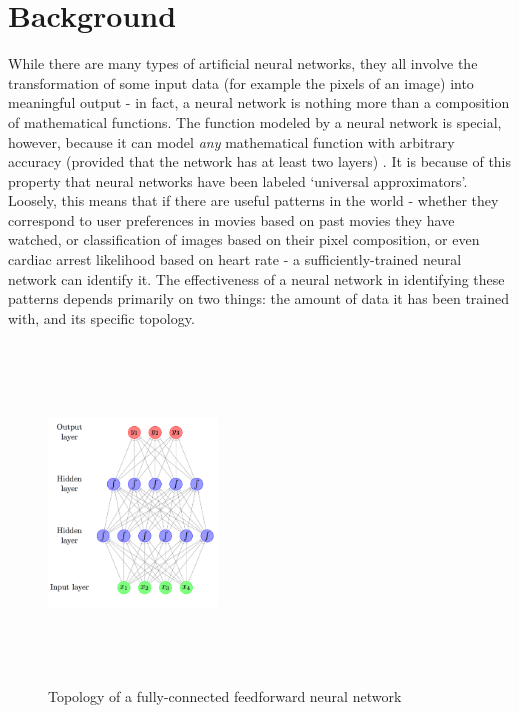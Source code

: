 \documentclass[12pt,letterpaper]{article}
\begin{document}
\section{Background}
While there are many types of artificial neural networks, they all involve the transformation of some input data (for example the pixels of an image) into meaningful output - in fact, a neural network is nothing more than a composition of mathematical functions. The function modeled by a neural network is special, however, because it can model \textit{any} mathematical function with arbitrary accuracy (provided that the network has at least two layers) \cite{dnn_history}. It is because of this property that neural networks have been labeled \enquote*{universal approximators}. Loosely, this means that if there are useful patterns in the world - whether they correspond to user preferences in movies based on past movies they have watched, or classification of images based on their pixel composition, or even cardiac arrest likelihood based on heart rate - a sufficiently-trained neural network can identify it. The effectiveness of a neural network in identifying these patterns depends primarily on two things: the amount of data it has been trained with, and its specific topology.
\par

\begin{figure}[h]
\centering
\includegraphics[width=0.4\textwidth,height=9cm]{neural_network_machinelearningmastery.png}
\captionsetup{width=0.7\linewidth}
\caption{ Topology of a fully-connected feedforward neural network \cite{feedforward_pic}}
\label{fig:feedforwardNN}
\end{figure}
\end{document}
